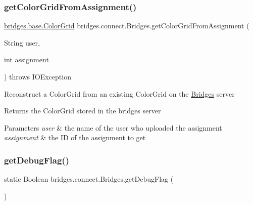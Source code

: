 \subsubsection{\texorpdfstring{get\+Color\+Grid\+From\+Assignment()}{getColorGridFromAssignment()}\hspace{0.1cm}{\footnotesize\ttfamily [2/2]}}
{\footnotesize\ttfamily \mbox{\hyperlink{classbridges_1_1base_1_1_color_grid}{bridges.\+base.\+Color\+Grid}} bridges.\+connect.\+Bridges.\+get\+Color\+Grid\+From\+Assignment (\begin{DoxyParamCaption}\item[{String}]{user,  }\item[{int}]{assignment }\end{DoxyParamCaption}) throws I\+O\+Exception}

Reconstruct a Color\+Grid from an existing Color\+Grid on the \mbox{\hyperlink{classbridges_1_1connect_1_1_bridges}{Bridges}} server

\begin{DoxyReturn}{Returns}
the Color\+Grid stored in the bridges server 
\end{DoxyReturn}

\begin{DoxyParams}{Parameters}
{\em user} & the name of the user who uploaded the assignment \\
\hline
{\em assignment} & the ID of the assignment to get \\
\hline
\end{DoxyParams}
\mbox{\label{classbridges_1_1connect_1_1_bridges_a5c9fa0dd62084bfd916c8bdecee3f517}} 
\subsubsection{\texorpdfstring{get\+Debug\+Flag()}{getDebugFlag()}}
{\footnotesize\ttfamily static Boolean bridges.\+connect.\+Bridges.\+get\+Debug\+Flag (\begin{DoxyParamCaption}{ }\end{DoxyParamCaption})\hspace{0.3cm}{\ttfamily [static]}}

\mbox{\label{classbridges_1_1connect_1_1_bridges_a58bef23cd12872c6ae5d7358b7485a2b}} 
